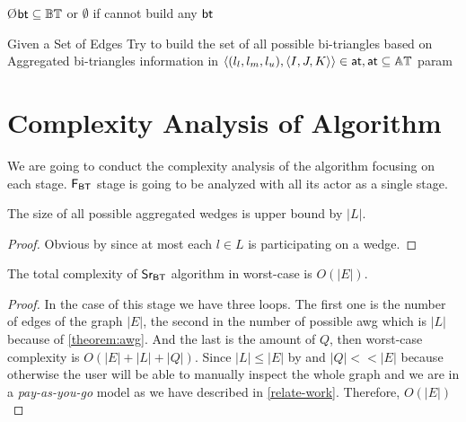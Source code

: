 \begin{algorithm}
\O{$\mathsf{bt} \subseteq \mathbb{BT}$ or $\emptyset$ if cannot build any $\mathsf{bt}$}
\caption{Given a Set of Edges Try to build the set of all possible bi-triangles based on Aggregated bi-triangles information in $\left\langle (l_l, l_m, l_u), \left\langle I,J,K \right\rangle \right\rangle \in \mathsf{at}, \mathsf{at} \subseteq \mathbb{AT}$ param}
\label{algo:buildBtEdge}
\end{algorithm}

\clearpage
\section{Complexity Analysis of Algorithm}
We are going to conduct the complexity analysis of the algorithm focusing on each stage. 
$\mathsf{F_{BT}}$ stage is going to be analyzed with all its actor as a single stage.

\begin{theorem}[$|\aw| \leq |L|$]\label{theorem:awg}
The size of all possible aggregated wedges is upper bound by $|L|$.
\end{theorem}
\begin{proof}
Obvious by  since at most each $l \in L$ is participating on a wedge.
\end{proof}

\begin{proposition}\label{prop:comp-src}
The total complexity of $\mathsf{Sr_{BT}}$ algorithm in worst-case is $O(|E|)$.
\end{proposition}
\begin{proof}
In the case of this stage we have three loops. The first one is the number of edges of the graph $|E|$, the second in the number 
of possible \acrshort{awg} which is $|L|$ because of \autoref{theorem:awg}.
And the last is the amount of $Q$, then worst-case complexity is $O(|E| + |L| + |Q|)$.
Since $|L| \leq |E|$ by  and $|Q| << |E|$ because otherwise the user will be able to manually inspect the whole graph and we are in a \emph{pay-as-you-go} model
as we have described in \autoref{relate-work}.
Therefore, $O(|E|)$ 
\end{proof}

